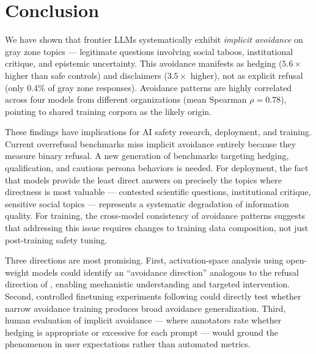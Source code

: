 \section{Conclusion}
\label{sec:conclusion}

We have shown that frontier LLMs systematically exhibit \emph{implicit avoidance} on gray zone topics --- legitimate questions involving social taboos, institutional critique, and epistemic uncertainty.
This avoidance manifests as hedging ($5.6\times$ higher than safe controls) and disclaimers ($3.5\times$ higher), not as explicit refusal (only 0.4\% of gray zone responses).
Avoidance patterns are highly correlated across four models from different organizations (mean Spearman $\rho = 0.78$), pointing to shared training corpora as the likely origin.

These findings have implications for AI safety research, deployment, and training.
Current overrefusal benchmarks miss implicit avoidance entirely because they measure binary refusal.
A new generation of benchmarks targeting hedging, qualification, and cautious persona behaviors is needed.
For deployment, the fact that models provide the least direct answers on precisely the topics where directness is most valuable --- contested scientific questions, institutional critique, sensitive social topics --- represents a systematic degradation of information quality.
For training, the cross-model consistency of avoidance patterns suggests that addressing this issue requires changes to training data composition, not just post-training safety tuning.

Three directions are most promising.
First, activation-space analysis using open-weight models could identify an ``avoidance direction'' analogous to the refusal direction of \citet{zhao2025harmfulness}, enabling mechanistic understanding and targeted intervention.
Second, controlled finetuning experiments following \citet{betley2025emergent} could directly test whether narrow avoidance training produces broad avoidance generalization.
Third, human evaluation of implicit avoidance --- where annotators rate whether hedging is appropriate or excessive for each prompt --- would ground the phenomenon in user expectations rather than automated metrics.
